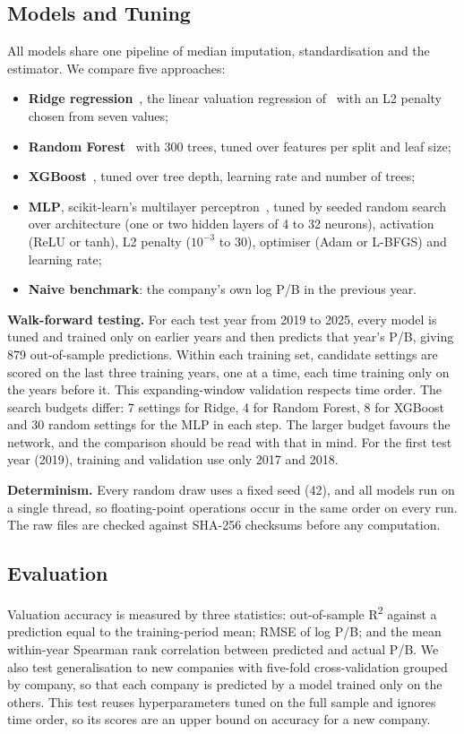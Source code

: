 \documentclass[conference]{IEEEtran}
\begin{document}
\subsection{Models and Tuning}
All models share one pipeline of median imputation, standardisation and the estimator. We compare five approaches:
\begin{itemize}
\item \textbf{Ridge regression}~\cite{hoerl1970}, the linear valuation regression of~\cite{bhojraj2002} with an L2 penalty chosen from seven values;
\item \textbf{Random Forest}~\cite{breiman2001} with 300 trees, tuned over features per split and leaf size;
\item \textbf{XGBoost}~\cite{chen2016}, tuned over tree depth, learning rate and number of trees;
\item \textbf{MLP}, scikit-learn's multilayer perceptron~\cite{pedregosa2011}, tuned by seeded random search~\cite{bergstra2012} over architecture (one or two hidden layers of 4 to 32 neurons), activation (ReLU or tanh), L2 penalty ($10^{-3}$ to 30), optimiser (Adam or L-BFGS) and learning rate;
\item \textbf{Naive benchmark}: the company's own log P/B in the previous year.
\end{itemize}

\textbf{Walk-forward testing.} For each test year from 2019 to 2025, every model is tuned and trained only on earlier years and then predicts that year's P/B, giving 879 out-of-sample predictions. Within each training set, candidate settings are scored on the last three training years, one at a time, each time training only on the years before it. This expanding-window validation respects time order. The search budgets differ: 7 settings for Ridge, 4 for Random Forest, 8 for XGBoost and 30 random settings for the MLP in each step. The larger budget favours the network, and the comparison should be read with that in mind. For the first test year (2019), training and validation use only 2017 and 2018.

\textbf{Determinism.} Every random draw uses a fixed seed (42), and all models run on a single thread, so floating-point operations occur in the same order on every run. The raw files are checked against SHA-256 checksums before any computation.

\subsection{Evaluation}
Valuation accuracy is measured by three statistics: out-of-sample R\textsuperscript{2} against a prediction equal to the training-period mean; RMSE of log P/B; and the mean within-year Spearman rank correlation between predicted and actual P/B. We also test generalisation to new companies with five-fold cross-validation grouped by company, so that each company is predicted by a model trained only on the others. This test reuses hyperparameters tuned on the full sample and ignores time order, so its scores are an upper bound on accuracy for a new company.
\end{document}
